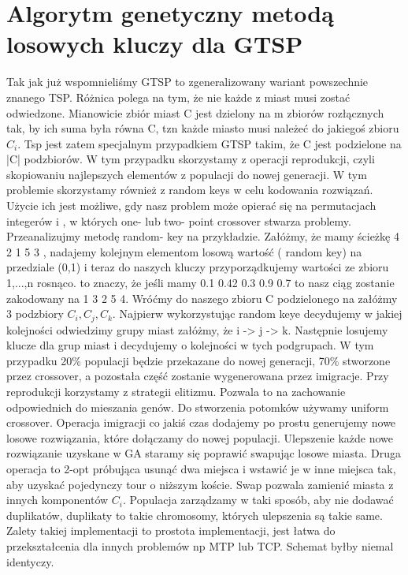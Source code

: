 \documentclass[11pt]{article}
\begin{document}
\section{Algorytm genetyczny metodą losowych kluczy dla GTSP}
Tak jak już wspomnieliśmy GTSP to zgeneralizowany wariant powszechnie znanego TSP. Różnica polega na tym, że nie każde z miast musi zostać odwiedzone. Mianowicie zbiór miast C jest dzielony na m zbiorów rozłącznych tak, by ich suma była równa C, tzn każde miasto musi należeć do jakiegoś zbioru $C_i$. Tsp jest zatem specjalnym przypadkiem GTSP takim, że C jest podzielone na |C| podzbiorów. W tym przypadku skorzystamy z operacji reprodukcji, czyli skopiowaniu najlepszych elementów z populacji do nowej generacji. W tym problemie skorzystamy również z random keys w celu kodowania rozwiązań. Użycie ich jest możliwe, gdy nasz problem może opierać się na permutacjach integerów i , w których one- lub two- point crossover stwarza problemy. Przeanalizujmy metodę random- key na przykładzie. 
Załóżmy, że mamy ścieżkę 4 2 1 5 3 , nadajemy kolejnym elementom losową wartość ( random key) na przedziale (0,1) i teraz do naszych kluczy przyporządkujemy wartości ze zbioru {1,...,n} rosnąco.
to znaczy, że jeśli mamy 0.1 0.42 0.3 0.9 0.7 to nasz ciąg zostanie zakodowany na 1 3 2 5 4. Wróćmy do naszego zbioru C podzielonego na  załóżmy 3 podzbiory $C_i,C_j,C_k$. Najpierw wykorzystując random keye decydujemy w jakiej kolejności odwiedzimy grupy miast załóżmy, że i -> j -> k. Następnie losujemy klucze dla grup miast i decydujemy o kolejności w tych podgrupach. W tym przypadku 20\% populacji będzie przekazane do nowej generacji, 70\% stworzone przez crossover, a pozostała część zostanie wygenerowana przez imigracje. Przy reprodukcji korzystamy z strategii elitizmu. Pozwala to na zachowanie odpowiednich do mieszania genów.  Do stworzenia potomków używamy uniform crossover. Operacja imigracji co jakiś czas dodajemy po prostu generujemy nowe losowe rozwiązania, które dołączamy do nowej populacji. Ulepszenie każde nowe rozwiązanie uzyskane w GA staramy się poprawić swapując losowe miasta. Druga operacja to 2-opt próbująca usunąć dwa miejsca i wstawić je w inne miejsca tak, aby uzyskać pojedynczy tour o niższym koście. Swap pozwala zamienić miasta z innych komponentów $C_i$. Populacja zarządzamy w taki sposób, aby nie dodawać duplikatów, duplikaty to takie chromosomy, których ulepszenia są takie same. Zalety takiej implementacji to prostota implementacji, jest łatwa do przekształcenia dla innych problemów np MTP lub TCP. Schemat byłby niemal identyczy.
\end{document}
